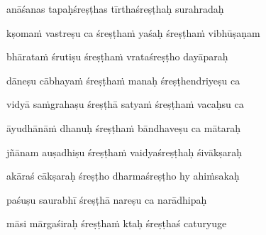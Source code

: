 anāśanas tapaḥśreṣṭhas tīrthaśreṣṭhaḥ surahradaḥ \veg\dontdisplaylinenum

kṣoma\.m vastreṣu ca śreṣṭha\.m yaśaḥ śreṣṭha\.m vibhūṣaṇam\thinspace{\dandab} \dontdisplaylinenum

bhārata\.m śrutiṣu śreṣṭha\.m vrataśreṣṭho dayāparaḥ \veg\dontdisplaylinenum

dāneṣu cābhaya\.m śreṣṭha\.m manaḥ śreṣṭhendriyeṣu ca\thinspace{\dandab} \dontdisplaylinenum

vidyā sa\.mgrahaṣu śreṣṭhā satya\.m śreṣṭha\.m vacaḥsu ca \veg\dontdisplaylinenum

āyudhānā\.m dhanuḥ śreṣṭha\.m bāndhaveṣu ca mātaraḥ\thinspace{\dandab} \dontdisplaylinenum

jñānam auṣadhiṣu śreṣṭha\.m vaidyaśreṣṭhaḥ śivākṣaraḥ \veg\dontdisplaylinenum
            \var{\vcd \om\ \msNb}%

akāraś cākṣaraḥ śreṣṭho dharmaśreṣṭho hy ahi\.msakaḥ\thinspace{\dandab} \dontdisplaylinenum

paśuṣu saurabhī śreṣṭhā nareṣu ca narādhipaḥ \veg\dontdisplaylinenum
            \var{\vo \om\ \msNb}%

māsi mārgaśiraḥ śreṣṭha\.m ktaḥ śreṣṭhaś caturyuge\thinspace{\dandab} \dontdisplaylinenum
            \var{\vo \om\ \msNb}%

